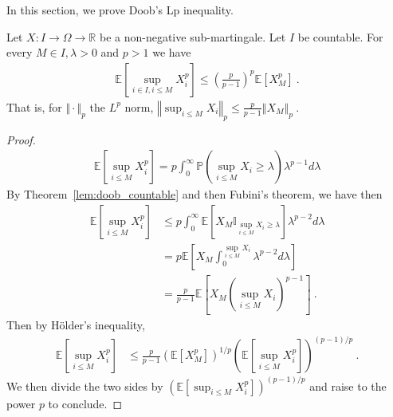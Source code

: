In this section, we prove Doob's Lp inequality.










\begin{lemma}\label{lem:doob_Lp_countable}
  Let $X : I \rightarrow \Omega \rightarrow \mathbb{R}$ be a non-negative sub-martingale. Let $I$ be countable.
  For every $M\in I,\lambda > 0$ and $p>1$ we have
  \begin{align*}
    \mathbb{E}\left[ \sup_{i\in I, i \leq M}X_i^p \right]
    \leq \left(\frac{p}{p-1}\right)^p\mathbb{E}[X_M^p]
    \: .
  \end{align*}
  That is, for $\Vert \cdot \Vert_p$ the $L^p$ norm,
  $\left\Vert \sup_{i \le M}  X_i  \right\Vert_p
    \leq \frac{p}{p-1} \left\Vert X_M \right\Vert_p
    \: .$
\end{lemma}

\begin{proof}
\begin{align*}
  \mathbb{E}\left[ \sup_{i \le M}X_i^p \right]
  = p \int_0^\infty \mathbb{P}\left( \sup_{i \le M}X_i \geq \lambda \right) \lambda^{p-1} d\lambda
\end{align*}
By Theorem~\ref{lem:doob_countable} and then Fubini's theorem, we have then
\begin{align*}
  \mathbb{E}\left[ \sup_{i \le M}X_i^p \right]
  &\le p \int_0^\infty \mathbb{E}\left[X_M \mathbb{I}_{\sup_{i \le M}X_i \ge \lambda}\right] \lambda^{p-2} d\lambda
  \\
  &= p \mathbb{E}\left[X_M \int_0^{\sup_{i \le M}X_i} \lambda^{p-2} d\lambda\right]
  \\
  &= \frac{p}{p - 1} \mathbb{E}\left[X_M (\sup_{i \le M}X_i)^{p-1}\right]
  \: .
\end{align*}
Then by Hölder's inequality,
\begin{align*}
  \mathbb{E}\left[ \sup_{i \le M}X_i^p \right]
  &\le \frac{p}{p - 1} \left(\mathbb{E}[X_M^p]\right)^{1/p} \left(\mathbb{E}\left[\sup_{i \le M}X_i^p \right]\right)^{(p-1)/p}
  \: .
\end{align*}
We then divide the two sides by $\left(\mathbb{E}\left[\sup_{i \le M}X_i^p \right]\right)^{(p-1)/p}$ and raise to the power $p$ to conclude.
\end{proof}



